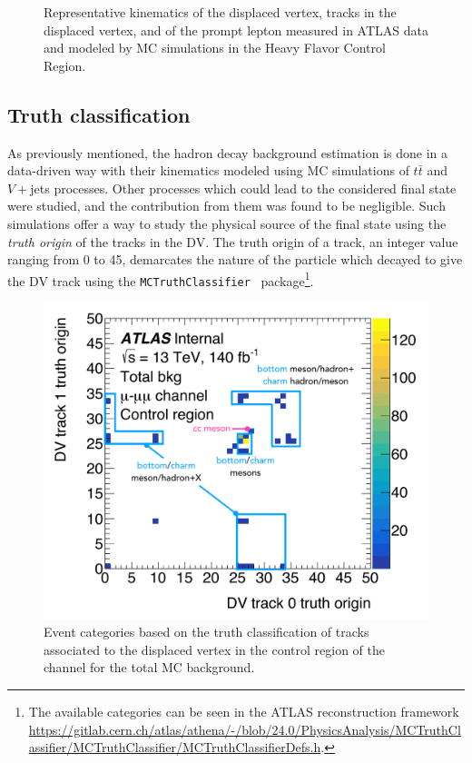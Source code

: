 \begin{figure}[!ht]
    \caption{Representative kinematics of the displaced vertex, tracks in the displaced vertex, and of the prompt lepton measured in ATLAS data and modeled by MC simulations in the \eee Heavy Flavor Control Region.}
    \label{fig:cr_plots_eee}
\end{figure}

\subsection{Truth classification}
As previously mentioned, the hadron decay background estimation is done in a data-driven way with their kinematics modeled using MC simulations of $t\bar{t}$ and $V+$jets processes. Other processes which could lead to the considered final state were studied, and the contribution from them was found to be negligible. Such simulations offer a way to study the physical source of the final state using the \textit{truth origin} of the tracks in the DV. The truth origin of a track, an integer value ranging from 0 to 45, demarcates the nature of the particle which decayed to give the DV track using the \texttt{MCTruthClassifier}~\cite{mc-truth-web} package\footnote{The available categories can be seen in the ATLAS reconstruction framework \url{https://gitlab.cern.ch/atlas/athena/-/blob/24.0/PhysicsAnalysis/MCTruthClassifier/MCTruthClassifier/MCTruthClassifierDefs.h}.}. 

\begin{figure}[!ht]
    \centering
    \includegraphics[width=0.66\linewidth]{figures/analysis_strategy/mc_classifier_studies/truth_classification_example.pdf}
    \caption{Event categories based on the truth classification of tracks associated to the displaced vertex in the control region of the \uuu channel for the total MC background.}
    \label{fig:mctruth_groups}
\end{figure}

